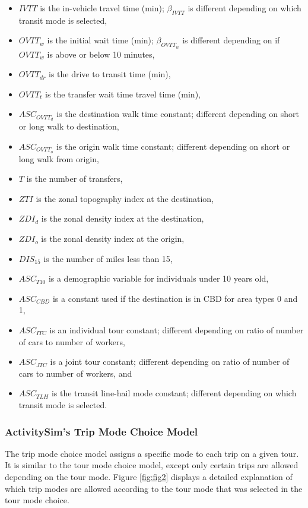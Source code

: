 \documentclass[3p, authoryear, review]{elsarticle} %
\providecommand{\tightlist}{%
  \setlength{\itemsep}{0pt}\setlength{\parskip}{0pt}}
\begin{document}
\begin{itemize}
\tightlist
\item
  \(IVTT\) is the in-vehicle travel time (min); \(\beta_{IVTT}\) is different depending on which transit mode is selected,
\item
  \(OVTT_w\) is the initial wait time (min); \(\beta_{OVTT_w}\) is different depending on if \(OVTT_w\) is above or below 10 minutes,
\item
  \(OVTT_{dr}\) is the drive to transit time (min),
\item
  \(OVTT_t\) is the transfer wait time travel time (min),\\
\item
  \(ASC_{OVTT_d}\) is the destination walk time constant; different depending on short or long walk to destination,
\item
  \(ASC_{OVTT_o}\) is the origin walk time constant; different depending on short or long walk from origin,
\item
  \(T\) is the number of transfers,
\item
  \(ZTI\) is the zonal topography index at the destination,
\item
  \(ZDI_d\) is the zonal density index at the destination,
\item
  \(ZDI_o\) is the zonal density index at the origin,
\item
  \(DIS_{15}\) is the number of miles less than 15,
\item
  \(ASC_{T10}\) is a demographic variable for individuals under 10 years old,
\item
  \(ASC_{CBD}\) is a constant used if the destination is in CBD for area types 0 and 1,
\item
  \(ASC_{ITC}\) is an individual tour constant; different depending on ratio of number of cars to number of workers,
\item
  \(ASC_{JTC}\) is a joint tour constant; different depending on ratio of number of cars to number of workers, and
\item
  \(ASC_{TLH}\) is the transit line-hail mode constant; different depending on which transit mode is selected.
\end{itemize}

\hypertarget{lit42}{%
\subsubsection{ActivitySim's Trip Mode Choice Model}\label{lit42}}

The trip mode choice model assigns a specific mode to each trip on a given tour. It is similar to the tour mode choice model, except only certain trips are allowed depending on the tour mode. Figure \ref{fig:fig2} displays a detailed explanation of which trip modes are allowed according to the tour mode that was selected in the tour mode choice.
\end{document}
